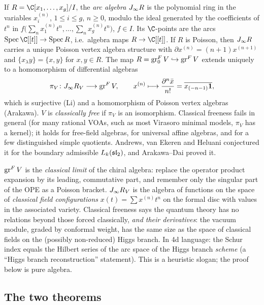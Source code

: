 If $R=\C[x_1,\dots,x_g]/I$, the \emph{arc algebra} $J_\infty R$ is the polynomial ring in the variables
$x_i^{(n)}$, $1\le i\le g$, $n\ge0$, modulo the ideal generated by the coefficients of $t^n$ in
$f\bigl(\sum_n x_1^{(n)}t^n,\dots,\sum_nx_g^{(n)}t^n\bigr)$, $f\in I$. Its $\C$-points are the arcs
$\operatorname{Spec}\C[[t]]\to\operatorname{Spec}R$, i.e.\ algebra maps $R\to\C[[t]]$. If $R$ is Poisson, then
$J_\infty R$ carries a unique Poisson vertex algebra structure with $\partial x^{(n)}=(n+1)x^{(n+1)}$ and
$\{x_\lambda y\}=\{x,y\}$ for $x,y\in R$. The map $R=\operatorname{gr}^F_0V\hookrightarrow\operatorname{gr}^F V$ extends uniquely
to a homomorphism of differential algebras
\begin{equation}\label{l20:eq:canonical}
\pi_V\colon J_\infty R_V\longrightarrow\operatorname{gr}^F V,\qquad x^{(n)}\longmapsto\frac{\partial^n\bar x}{n!}
=\overline{x_{(-n-1)}\mathbf{1}},
\end{equation}
which is surjective (Li) and a homomorphism of Poisson vertex algebras (Arakawa). $V$ is \emph{classically
free} if $\pi_V$ is an isomorphism. Classical freeness fails in general (for many rational VOAs, such as most
Virasoro minimal models, $\pi_V$ has a kernel); it holds for free-field algebras, for universal affine
algebras, and for a few distinguished simple quotients. Andrews, van Ekeren and Heluani conjectured it for
the boundary admissible $L_k(\mathfrak{sl}_2)$, and Arakawa--Dai proved it.

\begin{physics}
$\operatorname{gr}^F V$ is the \emph{classical limit} of the chiral algebra: replace the operator product expansion by
its leading, commutative part, and remember only the singular part of the OPE as a Poisson bracket.
$J_\infty R_V$ is the algebra of functions on the space of \emph{classical field configurations}
$x(t)=\sum x^{(n)}t^n$ on the formal disc with values in the associated variety. Classical freeness says the
quantum theory has no relations beyond those forced classically, \emph{and their derivatives}: the vacuum
module, graded by conformal weight, has the same size as the space of classical fields on the (possibly
non-reduced) Higgs branch. In 4d language: the Schur index equals the Hilbert series of the arc space of the
Higgs branch \emph{scheme} (a ``Higgs branch reconstruction'' statement). This is a heuristic slogan; the
proof below is pure algebra.
\end{physics}

\subsection{The two theorems}


